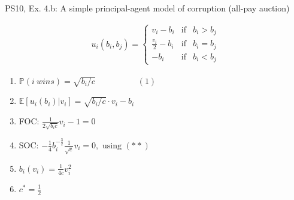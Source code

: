\begin{frame}{PS10, Ex. 4.b: A simple principal-agent model of corruption (all-pay auction)}
\begin{multicols}{2}
\begin{align*}
        u_i(b_i,b_j)=\left\{\begin{array}{lcl}
          v_i-b_i           & \text{if} & b_i>b_j \\
          \frac{v_i}{2}-b_i & \text{if} & b_i=b_j \\
          -b_i              & \text{if} & b_i<b_j
        \end{array}\right.
      \end{align*} \vspace{-16pt}
      \begin{enumerate}
        \item $\mathbb{P}(i\ wins)=\sqrt{b_i/c}\quad\quad\quad\quad\quad(1)$
        \item $\mathbb{E}[u_i(b_i)|v_i]=\sqrt{b_i/c}\cdot v_i-b_i$
        \item FOC: $\frac{1}{2\sqrt{b_ic}}v_i-1=0$
        \item[] SOC: $-\frac{1}{4}b_i^{-\frac{3}{2}}\frac{1}{\sqrt{c}}v_i=0,\text{ using }(**)$
        \item $b_i(v_i)=\frac{1}{4c}v_i^2$
        \item $c^*=\frac{1}{2}$
      \end{enumerate}
      \vfill\null
    \end{multicols}
\end{frame}
